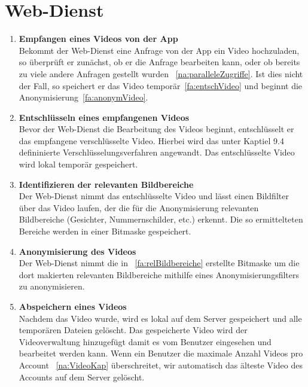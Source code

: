 \section{\gls{Web-Dienst}}
\begin{enumerate}
\renewcommand{\labelenumi}{\textbf{\theenumi}}
\renewcommand{\theenumi}{FA\arabic{enumi}0}
\setcounter{enumi}{199}

\item  \textbf{Empfangen eines Videos von der \gls{App}} \hfill \\
Bekommt der \gls{Web-Dienst} eine Anfrage von der \gls{App} ein Video hochzuladen, so überprüft er zunächst, ob er die Anfrage bearbeiten kann, oder ob bereits zu viele andere Anfragen gestellt wurden ~\eqref{na:paralleleZugriffe}. Ist dies nicht der Fall, so speichert er das Video temporär~\eqref{fa:entschVideo} und beginnt die Anonymisierung~\eqref{fa:anonymVideo}.

\item  \label{fa:entschVideo}\textbf{Entschlüsseln eines empfangenen Videos} \hfill \\
Bevor der \gls{Web-Dienst} die Bearbeitung des Videos beginnt, entschlüsselt er das empfangene verschlüsselte Video. Hierbei wird das unter Kaptiel 9.4 defininierte Verschlüsselungsverfahren angewandt. Das entschlüsselte Video wird lokal temporär gespeichert.

\item  \label{fa:relBildbereiche}\textbf{Identifizieren der relevanten Bildbereiche} \hfill \\
Der \gls{Web-Dienst} nimmt das entschlüsselte Video und lässt einen Bildfilter über das Video laufen, der die für die Anonymisierung relevanten Bildbereiche (Gesichter, Nummernschilder, etc.) erkennt. Die so ermittelteten Bereiche werden in einer Bitmaske gespeichert.

\item  \label{fa:anonymVideo}\textbf{Anonymisierung des Videos} \hfill \\
Der \gls{Web-Dienst} nimmt die in ~\eqref{fa:relBildbereiche} erstellte Bitmaske um die dort makierten relevanten Bildbereiche mithilfe eines Anonymisierungsfilters zu \gls{anonymisieren}.

\item \label{fa:speichVideo}\textbf{Abspeichern eines  Videos} \hfill \\
Nachdem das Video  wurde, wird es lokal auf dem Server gespeichert und alle temporären Dateien gelöscht. Das gespeicherte Video wird der Videoverwaltung hinzugefügt damit es vom Benutzer eingesehen und bearbeitet werden kann. Wenn ein Benutzer die maximale Anzahl Videos pro Account ~\eqref{na:VideoKap} überschreitet, wir automatisch das älteste Video des Accounts auf dem Server gelöscht.
\end{enumerate}

